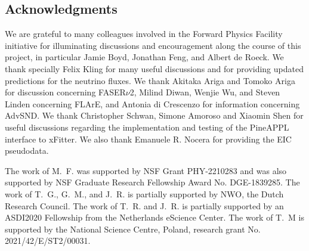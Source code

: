 \subsection*{Acknowledgments}
%
We are grateful to many colleagues involved in the Forward
Physics Facility initiative for illuminating
discussions and encouragement along the course of this project,
in particular Jamie Boyd, Jonathan Feng, and Albert de Roeck.
%
We thank specially Felix Kling for many useful discussions
and for providing updated predictions for the neutrino fluxes.
%
We thank Akitaka Ariga and Tomoko Ariga for discussion
concerning FASER$\nu$2, Milind Diwan,
Wenjie Wu, and Steven Linden concerning FLArE,
and Antonia di Crescenzo for information concerning AdvSND.
%
We thank Christopher Schwan, Simone Amoroso and Xiaomin Shen for useful 
discussions regarding the implementation and testing of the 
{\sc\small PineAPPL} interface to {\sc\small xFitter}.
%
We also thank Emanuele R. Nocera for providing the EIC pseudodata.

The work of M.~F. was supported by NSF Grant PHY-2210283 and was also supported by NSF Graduate Research Fellowship Award No. DGE-1839285.
%
The work of T.~G., G.~M., and J.~R. is partially supported by NWO, the Dutch Research Council.
%
The work of T.~R. and J.~R. is partially supported by an ASDI2020
Fellowship from the Netherlands eScience Center.
%
The work of T.~M is supported by the National Science Centre, Poland, research grant No. 2021/42/E/ST2/00031.
